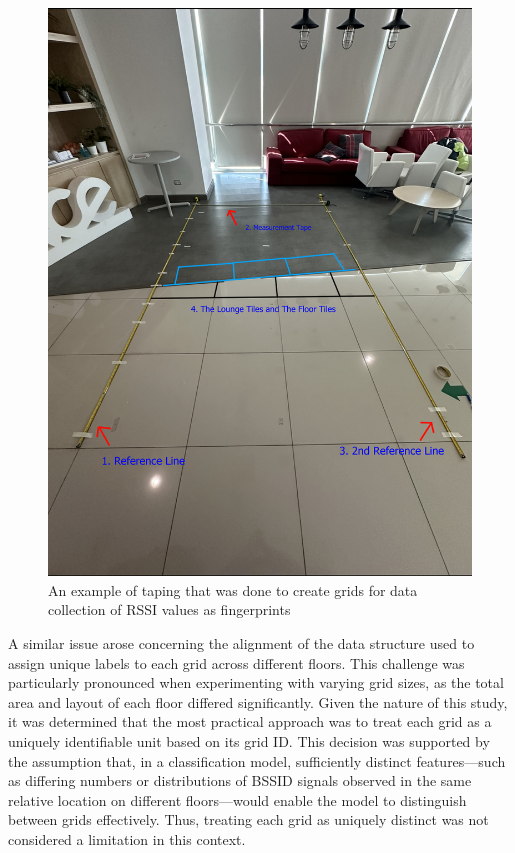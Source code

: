 \documentclass[runningheads]{llncs}
\begin{document}
\begin{figure}[!htbp]
	\centering
	\includegraphics[width=\textwidth]{meth2.jpg}
	\caption{An example of taping that was done to create grids for data collection of RSSI values as fingerprints}
	\label{fig:taping}
\end{figure}

A similar issue arose concerning the alignment of the data structure used to assign unique labels to each grid across different floors. This challenge was particularly pronounced when experimenting with varying grid sizes, as the total area and layout of each floor differed significantly. Given the nature of this study, it was determined that the most practical approach was to treat each grid as a uniquely identifiable unit based on its grid ID. This decision was supported by the assumption that, in a classification model, sufficiently distinct features—such as differing numbers or distributions of BSSID signals observed in the same relative location on different floors—would enable the model to distinguish between grids effectively. Thus, treating each grid as uniquely distinct was not considered a limitation in this context.
\end{document}
